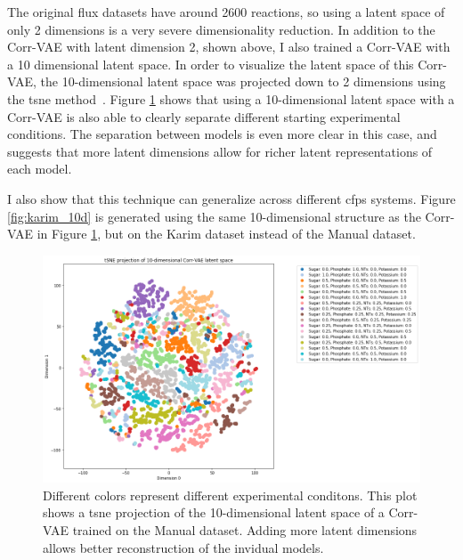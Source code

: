 The original flux datasets have around 2600 reactions, so using a latent space of only 2 dimensions is a very severe dimensionality reduction.
In addition to the Corr-VAE with latent dimension 2, shown above, I also trained a Corr-VAE with a 10 dimensional latent space.
In order to visualize the latent space of this Corr-VAE, the 10-dimensional latent space was projected down to 2 dimensions using the \gls{tsne} method~\cite{maaten2008visualizing}.
Figure \ref{fig:manual_10d} shows that using a 10-dimensional latent space with a Corr-VAE is also able to clearly separate different starting experimental conditions.
The separation between models is even more clear in this case, and suggests that more latent dimensions allow for richer latent representations of each model.

I also show that this technique can generalize across different \gls{cfps} systems.
Figure \ref{fig:karim_10d} is generated using the same 10-dimensional structure as the Corr-VAE in Figure \ref{fig:manual_10d}, but on the Karim dataset instead of the Manual dataset.

\begin{figure}[t!]
\begin{center}
\includegraphics[width=1.01\textwidth]{figs/TSNE_hand_latent10.png}
\caption[Projection of the latent space of a 10-dimensional Corr-VAE trained on the Manual dataset]{Different colors represent different experimental conditons.
This plot shows a \gls{tsne} projection of the 10-dimensional latent space of a Corr-VAE trained on the Manual dataset.
Adding more latent dimensions allows better reconstruction of the invidual models.
}
\label{fig:manual_10d}
\end{center}
\end{figure}

